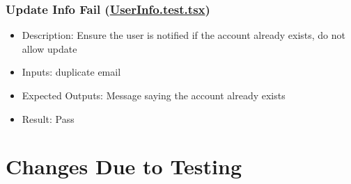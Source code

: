 \documentclass[12pt, titlepage]{article}
\begin{document}
\subsubsection{Update Info Fail (\href{https://github.com/OKKM-insights/frontend/blob/main/tests/__tests__/UserInfo.test.tsx}{UserInfo.test.tsx})}
\begin{itemize}
    \item Description: Ensure the user is notified if the account already exists, do not allow update
    \item Inputs: duplicate email
    \item Expected Outputs: Message saying the account already exists
    \item Result: Pass
\end{itemize}

\section{Changes Due to Testing}
\end{document}

